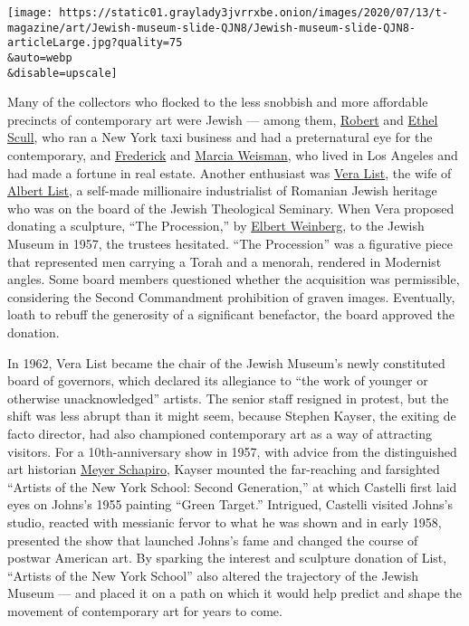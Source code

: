 \texttt{[image: https://static01.graylady3jvrrxbe.onion/images/2020/07/13/t-magazine/art/Jewish-museum-slide-QJN8/Jewish-museum-slide-QJN8-articleLarge.jpg?quality=75\\\&auto=webp\\\&disable=upscale]}

Many of the collectors who flocked to the less snobbish and more
affordable precincts of contemporary art were Jewish --- among them,
\href{https://www.nytimes3xbfgragh.onion/1986/01/03/obituaries/robert-scull-prominent-collector-of-pop-art.html}{Robert}
and
\href{https://www.nytimes3xbfgragh.onion/2001/09/01/arts/ethel-scull-a-patron-of-pop-and-minimal-art-dies-at-79.html}{Ethel
Scull}, who ran a New York taxi business and had a preternatural eye for
the contemporary, and
\href{https://www.nytimes3xbfgragh.onion/1994/09/13/obituaries/frederick-weisman-82-leader-in-the-business-and-art-worlds.html}{Frederick}
and
\href{https://www.nytimes3xbfgragh.onion/1991/10/22/arts/marcia-weisman-collector-73-supporter-of-major-art-museums.html}{Marcia
Weisman}, who lived in Los Angeles and had made a fortune in real
estate. Another enthusiast was
\href{https://www.nytimes3xbfgragh.onion/2002/10/13/nyregion/vera-g-list-94-is-dead-philanthropist-and-collector.html}{Vera
List}, the wife of
\href{https://www.nytimes3xbfgragh.onion/1987/09/12/obituaries/albert-a-list-86-industrialist-who-supported-many-causes.html}{Albert
List}, a self-made millionaire industrialist of Romanian Jewish heritage
who was on the board of the Jewish Theological Seminary. When Vera
proposed donating a sculpture, ``The Procession,'' by
\href{http://www.elbertweinberg.com/index.html}{Elbert Weinberg}, to the
Jewish Museum in 1957, the trustees hesitated. ``The Procession'' was a
figurative piece that represented men carrying a Torah and a menorah,
rendered in Modernist angles. Some board members questioned whether the
acquisition was permissible, considering the Second Commandment
prohibition of graven images. Eventually, loath to rebuff the generosity
of a significant benefactor, the board approved the donation.

In 1962, Vera List became the chair of the Jewish Museum's newly
constituted board of governors, which declared its allegiance to ``the
work of younger or otherwise unacknowledged'' artists. The senior staff
resigned in protest, but the shift was less abrupt than it might seem,
because Stephen Kayser, the exiting de facto director, had also
championed contemporary art as a way of attracting visitors. For a
10th-anniversary show in 1957, with advice from the distinguished art
historian
\href{https://www.nytimes3xbfgragh.onion/1996/03/04/us/meyer-schapiro-91-is-dead-his-work-wove-art-and-life.html}{Meyer
Schapiro}, Kayser mounted the far-reaching and farsighted ``Artists of
the New York School: Second Generation,'' at which Castelli first laid
eyes on Johns's 1955 painting ``Green Target.'' Intrigued, Castelli
visited Johns's studio, reacted with messianic fervor to what he was
shown and in early 1958, presented the show that launched Johns's fame
and changed the course of postwar American art. By sparking the interest
and sculpture donation of List, ``Artists of the New York School'' also
altered the trajectory of the Jewish Museum --- and placed it on a path
on which it would help predict and shape the movement of contemporary
art for years to come.

